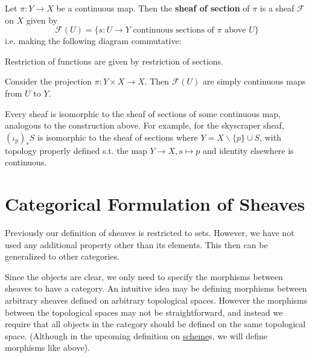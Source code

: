 \documentclass{article}
\begin{document}
\begin{definition}
    Let $\pi: Y \to X$ be a continuous map. Then the \textbf{sheaf of section} of $\pi$ is a sheaf $\mathcal{F}$ on $X$ given by
    \[
        \mathcal{F}(U) = \{ s: U \to Y  \text{ continuous sections of $\pi$ above $U$}\}
    \]
    i.e. making the following diagram commutative:

    \begin{minipage}{\linewidth}
        \centering
    \end{minipage}
    Restriction of functions are given by restriction of sections.
\end{definition}
\nogap
\begin{example}
    Consider the projection $\pi: Y \times X \to X$. Then $\mathcal{F}(U)$ are simply continuous maps from $U$ to $Y$.
\end{example}

\begin{remark}
    Every sheaf is isomorphic to the sheaf of sections of some continuous map, analogous to the construction above. For example, for the skyscraper sheaf, $(\iota_p)_{\ast} S$ is isomorphic to the sheaf of sections where $Y = X \smallsetminus \{ p \} \cup S$, with topology properly defined s.t. the map $Y \to X, s \mapsto p$ and identity elsewhere is continuous.
\end{remark}

\section{Categorical Formulation of Sheaves}

\textstart
Previously our definition of sheaves is restricted to sets. However, we have not used any additional property other than its elements. This then can be generalized to other categories. 

Since the objects are clear, we only need to specify the morphisms between sheaves to have a category. An intuitive idea may be defining morphisms between arbitrary sheaves defined on arbitrary topological spaces. However the morphisms between the topological spaces may not be straightforward, and instead we require that all objects in the category should be defined on the same topological space. (Although in the upcoming definition on \underline{scheme}s, we will define morphisms like above).
\end{document}
